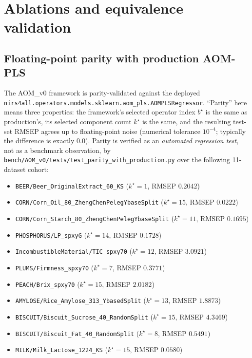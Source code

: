 \documentclass[review,a4paper]{elsarticle}
\newcommand{\AOM}{\textsc{AOM}\xspace}
\begin{document}
\section{Ablations and equivalence validation}\label{sec:ablations}

\subsection{Floating-point parity with production AOM-PLS}\label{sec:bit-parity}

The \AOM\_v0 framework is parity-validated against the deployed
\verb|nirs4all.operators.models.sklearn.aom_pls.AOMPLSRegressor|.
``Parity'' here means three properties: the framework's selected
operator index $b^\star$ is the same as production's, its selected
component count $k^\star$ is the same, and the resulting test-set RMSEP
agrees up to floating-point noise (numerical tolerance $10^{-4}$;
typically the difference is exactly $0.0$). Parity is verified as an
\emph{automated regression test}, not as a benchmark observation, by
\verb|bench/AOM_v0/tests/test_parity_with_production.py| over the
following 11-dataset cohort:

\begin{itemize}[leftmargin=2em,itemsep=0pt]
  \item \texttt{BEER/Beer\_OriginalExtract\_60\_KS} ($k^\star{=}1$,
        RMSEP $0.2042$)
  \item \texttt{CORN/Corn\_Oil\_80\_ZhengChenPelegYbaseSplit}
        ($k^\star{=}15$, RMSEP $0.0222$)
  \item \texttt{CORN/Corn\_Starch\_80\_ZhengChenPelegYbaseSplit}
        ($k^\star{=}11$, RMSEP $0.1695$)
  \item \texttt{PHOSPHORUS/LP\_spxyG} ($k^\star{=}14$, RMSEP $0.1728$)
  \item \texttt{IncombustibleMaterial/TIC\_spxy70} ($k^\star{=}12$,
        RMSEP $3.0921$)
  \item \texttt{PLUMS/Firmness\_spxy70} ($k^\star{=}7$, RMSEP $0.3771$)
  \item \texttt{PEACH/Brix\_spxy70} ($k^\star{=}15$, RMSEP $2.0182$)
  \item \texttt{AMYLOSE/Rice\_Amylose\_313\_YbasedSplit}
        ($k^\star{=}13$, RMSEP $1.8873$)
  \item \texttt{BISCUIT/Biscuit\_Sucrose\_40\_RandomSplit}
        ($k^\star{=}15$, RMSEP $4.3469$)
  \item \texttt{BISCUIT/Biscuit\_Fat\_40\_RandomSplit} ($k^\star{=}8$,
        RMSEP $0.5491$)
  \item \texttt{MILK/Milk\_Lactose\_1224\_KS} ($k^\star{=}15$, RMSEP
        $0.0580$)
\end{itemize}
\end{document}
